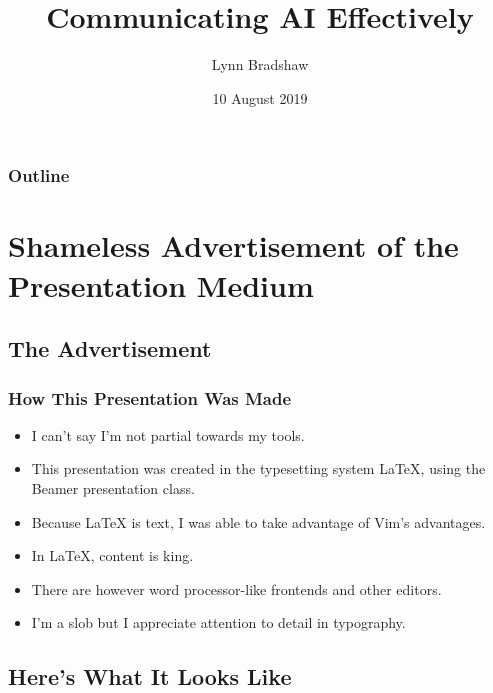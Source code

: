 \documentclass[10pt]{beamer}
\title{Communicating AI Effectively}
\author{Lynn Bradshaw}
\date{10 August 2019}
\begin{document}
  \begin{frame}
    \maketitle
  \end{frame}

  \begin{frame}
    \frametitle{Outline}
  \end{frame}

  \section{Shameless Advertisement of the Presentation Medium}

  \subsection{The Advertisement}

  \begin{frame}
    \frametitle{How This Presentation Was Made}
    \begin{itemize}
      \item I can't say I'm not partial towards my tools.
      \pause
      \item This presentation was created in the typesetting system \LaTeX,
        using the Beamer presentation class.
      \pause
      \item Because \LaTeX{} is text, I was able to take advantage of Vim's
        advantages.
      \pause
      \item In \LaTeX, content is king.
      \item There are however word processor-like frontends and other editors.
      \pause
      \item I'm a slob but I appreciate attention to detail in typography.
    \end{itemize}
  \end{frame}

  \subsection{Here's What It Looks Like}
\end{document}
